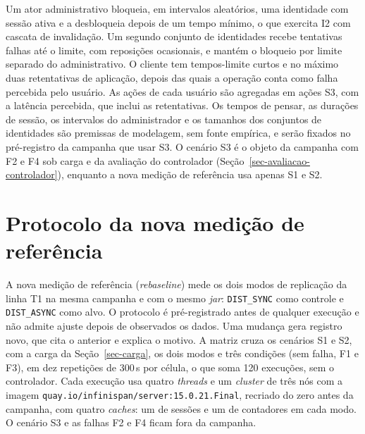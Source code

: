 Um ator administrativo bloqueia, em intervalos aleatórios, uma identidade com sessão ativa e a desbloqueia depois de um tempo mínimo, o que exercita I2 com cascata de invalidação. Um segundo conjunto de identidades recebe tentativas falhas até o limite, com reposições ocasionais, e mantém o bloqueio por limite separado do administrativo. O cliente tem tempos-limite curtos e no máximo duas retentativas de aplicação, depois das quais a operação conta como falha percebida pelo usuário. As ações de cada usuário são agregadas em ações S3, com a latência percebida, que inclui as retentativas. Os tempos de pensar, as durações de sessão, os intervalos do administrador e os tamanhos dos conjuntos de identidades são premissas de modelagem, sem fonte empírica, e serão fixados no pré-registro da campanha que usar S3. O cenário S3 é o objeto da campanha com F2 e F4 sob carga e da avaliação do controlador (Seção~\ref{sec-avaliacao-controlador}), enquanto a nova medição de referência usa apenas S1 e S2.

\section*{Protocolo da nova medição de referência}
\label{sec-protocolo-rebaseline}

A nova medição de referência (\emph{rebaseline}) mede os dois modos de replicação da linha T1 na mesma campanha e com o mesmo \emph{jar}: \texttt{DIST\_SYNC} como controle e \texttt{DIST\_ASYNC} como alvo. O protocolo é pré-registrado \citep{nosek_preregistration_2018} antes de qualquer execução e não admite ajuste depois de observados os dados. Uma mudança gera registro novo, que cita o anterior e explica o motivo. A matriz cruza os cenários S1 e S2, com a carga da Seção~\ref{sec-carga}, os dois modos e três condições (sem falha, F1 e F3), em dez repetições de 300\,s por célula, o que soma 120 execuções, sem o controlador. Cada execução usa quatro \emph{threads} e um \emph{cluster} de três nós com a imagem \texttt{quay.io/infinispan/server:15.0.21.Final}, recriado do zero antes da campanha, com quatro \emph{caches}: um de sessões e um de contadores em cada modo. O cenário S3 e as falhas F2 e F4 ficam fora da campanha.

